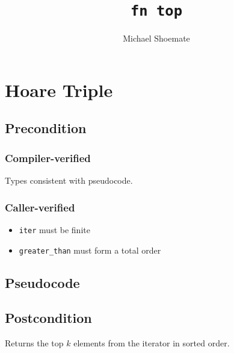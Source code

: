 \documentclass{article}
\title{\texttt{fn top}}
\author{Michael Shoemate}
\begin{document}
  
\maketitle 
 
\section{Hoare Triple} 
\subsection*{Precondition} 
\subsubsection*{Compiler-verified}
Types consistent with pseudocode.

\subsubsection*{Caller-verified}

\begin{itemize}
    \item \texttt{iter} must be finite 
    \item \texttt{greater\_than} must form a total order
\end{itemize}

\subsection*{Pseudocode} 
\label{sec:python-pseudocode} 
 
 
\subsection*{Postcondition} 

\begin{theorem}
    Returns the top $k$ elements from the iterator in sorted order.
\end{theorem}
\end{document}
